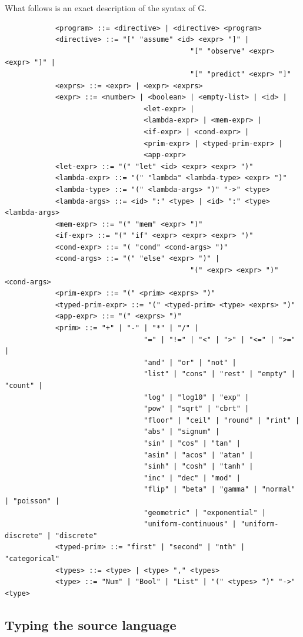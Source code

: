 \documentclass[a4paper]{article}
\begin{document}
What follows is an exact description of the syntax of G.
\begin{center}
	\begin{varwidth}{\linewidth}
		\small
		\begin{verbatim}
			<program> ::= <directive> | <directive> <program>
			<directive> ::= "[" "assume" <id> <expr> "]" |
											"[" "observe" <expr> <expr> "]" |
											"[" "predict" <expr> "]"
			<exprs> ::= <expr> | <expr> <exprs>
			<expr> ::= <number> | <boolean> | <empty-list> | <id> |
								 <let-expr> |
								 <lambda-expr> | <mem-expr> |
								 <if-expr> | <cond-expr> |
								 <prim-expr> | <typed-prim-expr> |
								 <app-expr>
			<let-expr> ::= "(" "let" <id> <expr> <expr> ")"
			<lambda-expr> ::= "(" "lambda" <lambda-type> <expr> ")"
			<lambda-type> ::= "(" <lambda-args> ")" "->" <type>
			<lambda-args> ::= <id> ":" <type> | <id> ":" <type> <lambda-args>
			<mem-expr> ::= "(" "mem" <expr> ")"
			<if-expr> ::= "(" "if" <expr> <expr> <expr> ")"
			<cond-expr> ::= "( "cond" <cond-args> ")"
			<cond-args> ::= "(" "else" <expr> ")" |
											"(" <expr> <expr> ")" <cond-args>
			<prim-expr> ::= "(" <prim> <exprs> ")"
			<typed-prim-expr> ::= "(" <typed-prim> <type> <exprs> ")"
			<app-expr> ::= "(" <exprs> ")"
			<prim> ::= "+" | "-" | "*" | "/" |
								 "=" | "!=" | "<" | ">" | "<=" | ">=" |
								 "and" | "or" | "not" |
								 "list" | "cons" | "rest" | "empty" | "count" |
								 "log" | "log10" | "exp" |
								 "pow" | "sqrt" | "cbrt" |
								 "floor" | "ceil" | "round" | "rint" |
								 "abs" | "signum" |
								 "sin" | "cos" | "tan" |
								 "asin" | "acos" | "atan" |
								 "sinh" | "cosh" | "tanh" |
								 "inc" | "dec" | "mod" |
								 "flip" | "beta" | "gamma" | "normal" | "poisson" |
								 "geometric" | "exponential" |
								 "uniform-continuous" | "uniform-discrete" | "discrete"
			<typed-prim> ::= "first" | "second" | "nth" | "categorical"
			<types> ::= <type> | <type> "," <types>
			<type> ::= "Num" | "Bool" | "List" | "(" <types> ")" "->" <type>
		\end{verbatim}
	\end{varwidth}
\end{center}




\subsection{Typing the source language}
\end{document}
